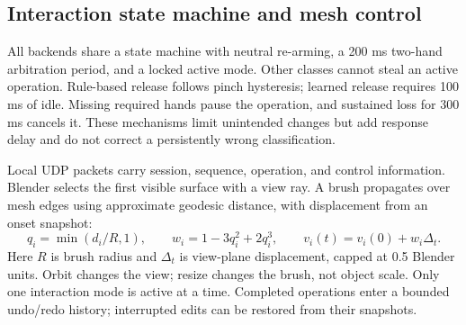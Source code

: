 \documentclass{article}
\newif\ifdraftnotes
\newcommand{\workitem}[7]{%
  \ifdraftnotes
  \begin{tcolorbox}[title={#1},title after break={#1 (continued)}]
  \textbf{Owner: }#2\par
  \textbf{Task: }#3\par
  \textbf{Protocol: }#4\par
  \textbf{Deliverables: }#5\par
  \textbf{Fill here: }#6\par
  \textbf{Done when: }#7
  \end{tcolorbox}
  \fi}
\newcommand{\code}[1]{\texttt{\detokenize{#1}}}
\begin{document}
\workitem{M1 | Train the existing baselines fairly}
{B (name to be assigned); depends on A's fixed split and D's shared preprocessing.}
{Run rules, MLP, and GRU. Keep the existing architectures and first check that labels, features, and online inference agree.}
{Use EMA inputs derived from raw landmarks ($\alpha=0.45$) and the same state machine for the main comparison. Train learned models with seeds 42/43/44 for at most 50 epochs; choose rule thresholds on validation data only. Do not use \code{--allow-synthetic} for reported human results. Although the MLP sees only the final frame, retain and document its current 24-frame warm-up.}
{Save \code{best.pt}, \code{training.json}, \code{split.json}, evaluation JSON, confusion matrices, configuration, and source version for each run. Rules need no repeated training.}
{Check this subsection against the final configuration; complete Tables~\ref{tab:recognition} and~\ref{tab:events} and the associated failure analysis.}
{Initial results by Tuesday, Oct. 20; all three seeds by Thursday, Oct. 22. Tune using \code{evaluate --partition val}; evaluate test only after freezing the configuration.}

\subsection{Interaction state machine and mesh control}
All backends share a state machine with neutral re-arming, a 200 ms two-hand
arbitration period, and a locked active mode. Other classes cannot steal an active
operation. Rule-based release follows pinch hysteresis; learned release requires
100 ms of idle. Missing required hands pause the operation, and sustained loss
for 300 ms cancels it. These mechanisms limit unintended changes but add response
delay and do not correct a persistently wrong classification.

Local UDP packets carry session, sequence, operation, and control information.
Blender selects the first visible surface with a view ray. A brush propagates over
mesh edges using approximate geodesic distance, with displacement from an onset
snapshot:
\begin{equation}
 q_i=\min(d_i/R,1),\qquad w_i=1-3q_i^2+2q_i^3,\qquad
 v_i(t)=v_i(0)+w_i\Delta_t .
\end{equation}
Here $R$ is brush radius and $\Delta_t$ is view-plane displacement, capped at 0.5
Blender units. Orbit changes the view; resize changes the brush, not object scale.
Only one interaction mode is active at a time. Completed operations enter a bounded
undo/redo history; interrupted edits can be restored from their snapshots.
\end{document}
